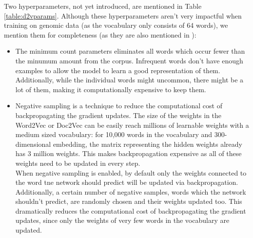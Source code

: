 Two hyperparameters, not yet introduced, are mentioned in Table \ref{table:d2vparams}. Although these hyperparameters aren't very impactful when training on genomic data (as the vocabulary only consists of 64 words), we mention them for completeness (as they are also mentioned in \cite{d2vsplicing}):
\begin{itemize}
	\item The minimum count parameters eliminates all words which occur fewer than the minumum amount from the corpus. Infrequent words don't have enough examples to allow the model to learn a good representation of them. Additionally, while the individual words might uncommon, there might be a lot of them, making it computationally expensive to keep them.
	
	\item Negative sampling \cite{w2v2} 
	is a technique to reduce the computational cost of backpropagating the gradient updates. The size of the weights in the Word2Vec or Doc2Vec can be easily reach millions of learnable weights with a medium sized vocabulary: for 10,000 words in the vocabulary and 300-dimensional embedding, the matrix representing the hidden weights already has 3 million weights. This makes backpropagation expensive as all of these weights need to be updated in every step. \\
	When negative sampling is enabled, by default only the weights connected to the word tne network should predict will be updated via backpropagation. Additionally, a certain number of negative samples, words which the network shouldn't predict, are randomly chosen and their weights updated too. This dramatically reduces the computational cost of backpropagating the gradient updates, since only the weights of very few words in the vocabulary are updated. 
\end{itemize}



 

